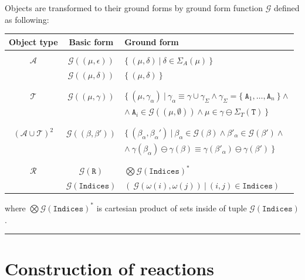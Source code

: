 \documentclass[12pt]{fithesis2}
\begin{document}
Objects are transformed to their ground forms by ground form function $\mathcal{G}$ defined as following:

\begin{center}
\begin{tabular}{ c c l }
Object type & Basic form & Ground form \\
\hline
 & & \\
$\mathcal{A}$ & $\mathcal{G}((\mu, \epsilon))$ & $\{~ (\mu, \delta) ~|~ \delta \in \Sigma_A(\mu) ~\}$\\
 & $\mathcal{G}((\mu, \delta))$ & $\{~(\mu, \delta) ~\}$\\
 & & \\
 \hline
 & & \\
$\mathcal{T}$ & $\mathcal{G}((\mu, \gamma))$ & $\{~ (\mu, \gamma_\alpha) ~|~ \gamma_\alpha \equiv \gamma \cup \gamma_\Sigma \wedge \gamma_\Sigma = \{~ \mathtt{A}_1, \ldots, \mathtt{A}_n ~\} \wedge$\\
 & & $\wedge~ \mathtt{A}_i \in \mathcal{G}((\mu, \emptyset)) \wedge \mu \in \gamma \ominus \Sigma_T(\mathtt{T}) ~\}$ \\
 & & \\
 \hline
 & & \\
$(\mathcal{A} \cup \mathcal{T})^2$ & $\mathcal{G}((\beta, \beta'))$ & $\{~ (\beta_\alpha, \beta_\alpha') ~|~ \beta_\alpha \in \mathcal{G}(\beta) \wedge \beta'_\alpha \in \mathcal{G}(\beta') \wedge$\\
 & & $\wedge~ \gamma(\beta_\alpha) \ominus \gamma(\beta) \equiv \gamma(\beta'_\alpha) \ominus \gamma(\beta') ~\} $ \\
 & & \\
 \hline
 & & \\
$\mathcal{R}$ & $\mathcal{G}(\mathtt{R})$ & $ \bigotimes \mathcal{G}(\mathtt{Indices})^* $ \\
 & $\mathcal{G}(\mathtt{Indices})$ & $(~\mathcal{G}(\omega(i), \omega(j)) ~|~ (i,j) \in \mathtt{Indices})$\\
 
\end{tabular}
\end{center}

where $\bigotimes \mathcal{G}(\mathtt{Indices})^*$ is cartesian product of sets inside of tuple $\mathcal{G}(\mathtt{Indices})$.

\noindent\rule{\textwidth}{2pt}

\section{Construction of reactions}
\label{Generating reactions}
\end{document}
